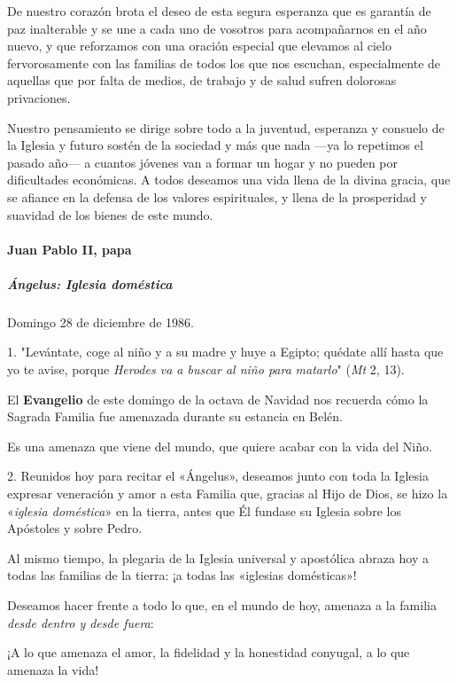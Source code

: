 \documentclass[]{article}
\let\oldparagraph\paragraph
\renewcommand{\paragraph}[1]{\oldparagraph{#1}\mbox{}}
\let\oldsubparagraph\subparagraph
\renewcommand{\subparagraph}[1]{\oldsubparagraph{#1}\mbox{}}
\begin{document}
De nuestro corazón brota el deseo de esta segura esperanza que es
garantía de paz inalterable y se une a cada uno de vosotros para
acompañarnos en el año nuevo, y que reforzamos con una oración especial
que elevamos al cielo fervorosamente con las familias de todos los que
nos escuchan, especialmente de aquellas que por falta de medios, de
trabajo y de salud sufren dolorosas privaciones.

Nuestro pensamiento se dirige sobre todo a la juventud, esperanza y
consuelo de la Iglesia y futuro sostén de la sociedad y más que nada
---ya lo repetimos el pasado año--- a cuantos jóvenes van a formar un
hogar y no pueden por dificultades económicas. A todos deseamos una vida
llena de la divina gracia, que se afiance en la defensa de los valores
espirituales, y llena de la prosperidad y suavidad de los bienes de este
mundo.

\paragraph{Juan Pablo II, papa}\label{juan-pablo-ii-papa}

\subparagraph{Ángelus: Iglesia
doméstica}\label{uxe1ngelus-iglesia-domuxe9stica}

Domingo 28 de diciembre de 1986.

1. "Levántate, coge al niño y a su madre y huye a Egipto; quédate allí
hasta que yo te avise, porque \emph{Herodes va a buscar al niño para}
\emph{matarlo}" (\emph{Mt} 2, 13).

El \textbf{Evangelio} de este domingo de la octava de Navidad nos
recuerda cómo la Sagrada Familia fue amenazada durante su estancia en
Belén.

Es una amenaza que viene del mundo, que quiere acabar con la vida del
Niño.

2. Reunidos hoy para recitar el «Ángelus», deseamos junto con toda la
Iglesia expresar veneración y amor a esta Familia que, gracias al Hijo
de Dios, se hizo la «\emph{iglesia doméstica}» en la tierra, antes que
Él fundase su Iglesia sobre los Apóstoles y sobre Pedro.

Al mismo tiempo, la plegaria de la Iglesia universal y apostólica abraza
hoy a todas las familias de la tierra: ¡a todas las «iglesias
domésticas»!

Deseamos hacer frente a todo lo que, en el mundo de hoy, amenaza a la
familia \emph{desde dentro y desde fuera}:

¡A lo que amenaza el amor, la fidelidad y la honestidad conyugal, a lo
que amenaza la vida!
\end{document}
